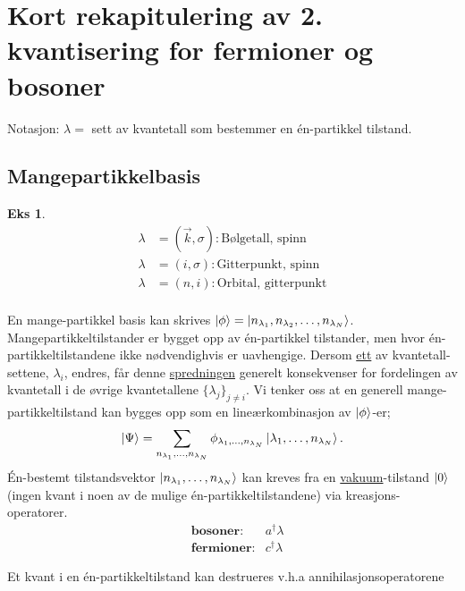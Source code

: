\section{Kort rekapitulering av 2. kvantisering for fermioner og bosoner}

Notasjon: $ \lambda = $ sett av kvantetall som bestemmer en én-partikkel tilstand.


\subsection{Mangepartikkelbasis}
\newtheorem{theorem}{Eks}
\begin{theorem}


\begin{align*}
\lambda &= (\vec{k}, \sigma):\text{Bølgetall, spinn} \\
\lambda &= (i, \sigma) : \text{Gitterpunkt, spinn} \\
\lambda &= (n, i) : \text{Orbital, gitterpunkt} \\
\end{align*}

\end{theorem}

En mange-partikkel basis kan skrives $\ket{\phi} = \ket{n_{\lambda_1}, n_{\lambda_2}, \dots, n_{\lambda_N}}$. Mangepartikkeltilstander er bygget opp av én-partikkel tilstander, men hvor én-partikkeltilstandene ikke nødvendighvis er uavhengige. Dersom \underline{ett} av kvantetall-settene, $\lambda_i$, endres, får denne \underline{spredningen} generelt konsekvenser for fordelingen av kvantetall i de øvrige kvantetallene $\{\lambda_j\}_{j\ne i}$.
Vi tenker oss at en generell mange-partikkeltilstand kan bygges opp som en lineærkombinasjon av $\ket{\phi}$-er;
\begin{equation}
\ket{\Psi} = \sum_{n_{\lambda_1},\dots, n_{\lambda_N}}\phi_{{\lambda_1},\dots, n_{\lambda_N}}\ket{{\lambda_1},\dots, n_{\lambda_N}}.
\end{equation}
Én-bestemt tilstandsvektor $\ket{n_{\lambda_1},\dots, n_{\lambda_N}}$ kan kreves fra en \underline{vakuum}-tilstand $\ket{0}$ (ingen kvant i noen av de mulige én-partikkeltilstandene) via kreasjons-operatorer.
\begin{align*}
&\textbf{bosoner}: &a^\dagger\lambda \\ 
&\textbf{fermioner}: &c^\dagger\lambda
\end{align*}


Et kvant i en én-partikkeltilstand kan destrueres  v.h.a annihilasjonsoperatorene

